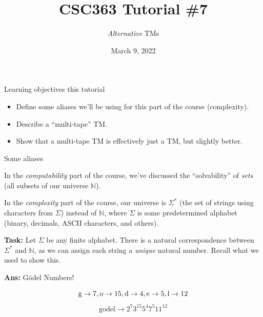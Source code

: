 \documentclass{beamer}
\title{CSC363 Tutorial \#7}
\subtitle{\textit{Alternative} TMs}
\date{March 9, 2022}
\institute{}
\newcommand{\N}{{\mathbb N}}
\begin{document}
\maketitle

\begin{frame}{Learning objectives this tutorial}
\begin{itemize}
\item Define some aliases we'll be using for this part of the course (complexity).
\item Describe a ``multi-tape'' TM.
\item Show that a multi-tape TM is effectively just a TM, but slightly better.
\end{itemize}
\end{frame}

\begin{frame}{Some aliases}

In the \textit{computability} part of the course, we've discussed the ``solvability'' of \textit{sets} (all subsets of our universe $\N$).

\vspace{2mm} \pause

In the \textit{complexity} part of the course, our universe is $\Sigma^*$ (the set of strings using characters from $\Sigma$) instead of $\N$, where $\Sigma$ is some predetermined alphabet (binary, decimals, ASCII characters, and others).

\vspace{2mm} \pause

\textbf{Task:} Let $\Sigma$ be any finite alphabet. There is a natural correspondence between $\Sigma^*$ and $\N$, as we can assign each string a \textit{unique} natural number. Recall what we used to show this.

\vspace{2mm} \pause

\textbf{Ans:} G\"odel Numbers!

$$\text g \rightarrow 7, \text o \rightarrow 15, \text d \rightarrow 4, \text e \rightarrow 5, \text l \rightarrow 12$$
$$\text{godel} \rightarrow 2^7 3^{15} 5^{4} 7^{5} 11^{12}$$

\end{frame}
\end{document}
